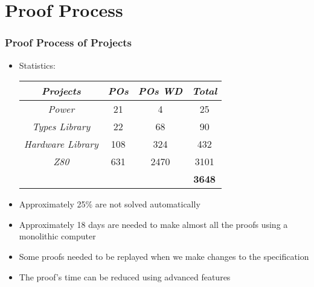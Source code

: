 \section{Proof Process}

\begin{frame}
\frametitle{Proof Process of Projects}

\begin{itemize}
   \item Statistics:\\
    \begin{center}{\footnotesize
  	 \begin{tabular}{|c|c|c|c|}
		\hline
		 \textsl{Projects} &  \textsl{POs}	& \textsl{POs WD} &	\textsl{Total}\\
		\hline
		\textit{Power} & 	21 &	4 &	25\\
		\hline
		\textit{Types Library} &	22 &	68 &	90\\
		\hline
		\textit{Hardware Library} &	108 &	324 &	432\\
		\hline
		\textit{Z80} &	631	 & 2470 & 	3101\\
		\hline
		   &    &  & 		\textbf{3648}\\
		\hline
	 \end{tabular}
   }
	\end{center}

   \item  Approximately 25\% are not solved automatically
	\item Approximately 18 days are needed to make almost all the proofs using a monolithic computer
	\item Some proofs needed to be replayed when we make changes to the specification
	\item The proof's time can be reduced using advanced features
	
	
\end{itemize}

\end{frame}


